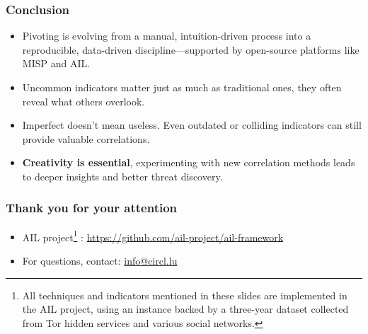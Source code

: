 \documentclass[10pt,aspectratio=169, colorlinks=true, linkcolor=circlBlue]{beamer}
\begin{document}
\begin{frame}
    \frametitle{Conclusion}
    \begin{itemize}
        \item Pivoting is evolving from a manual, intuition-driven process into a reproducible, data-driven discipline—supported by open-source platforms like MISP and AIL.
        \item Uncommon indicators matter just as much as traditional ones, they often reveal what others overlook.
        \item Imperfect doesn’t mean useless. Even outdated or colliding indicators can still provide valuable correlations.
	\item {\bf Creativity is essential}, experimenting with new correlation methods leads to deeper insights and better threat discovery.
    \end{itemize}
\end{frame}

\begin{frame}
	\frametitle{Thank you for your attention}
	\begin{itemize}
		\item AIL project\footnote{All techniques and indicators mentioned in these slides are implemented in the AIL project, using an instance backed by a three-year dataset collected from Tor hidden services and various social networks.}
: \url{https://github.com/ail-project/ail-framework}
		\item For questions, contact: \href{mailto:info@circl.lu}{info@circl.lu}
	\end{itemize}
\end{frame}
\end{document}
